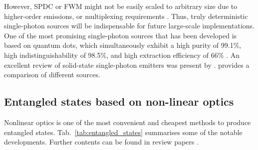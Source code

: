 However, SPDC or FWM might not be easily scaled to arbitrary size due to higher-order emissions, or multiplexing requirements \cite{bib:RohdeLoopMulti15}. Thus, truly deterministic single-photon sources will be indispensable for future large-scale implementations. One of the most promising single-photon sources that has been developed is based on quantum dots, which simultaneously exhibit a high purity of 99.1\%, high indistinguishability of 98.5\%, and high extraction efficiency of 66\% \cite{bib:he2013on, bib:wei2014de, bib:ding2016on, bib:somaschi2016, bib:wang2016near, bib:loredo2016}. An excellent review of solid-state single-photon emitters was present by \cite{bib:aharonovich2016solid}. \cite{bib:eisaman2011} provides a comparison of different sources.

%
%

\subsection{Entangled states based on non-linear optics} 

Nonlinear optics is one of the most convenient and cheapest methods to produce entangled states. Tab.~\ref{tab:entangled_states} summarises some of the notable developments. Further contents can be found in review papers \cite{bib:pan2012multiphoton, bib:ralph2009bright}.

